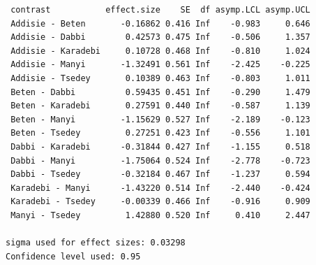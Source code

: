 \documentclass[
  letterpaper,
  DIV=11,
  numbers=noendperiod]{scrartcl}
\begin{document}
\begin{verbatim}
 contrast           effect.size    SE  df asymp.LCL asymp.UCL
 Addisie - Beten       -0.16862 0.416 Inf    -0.983     0.646
 Addisie - Dabbi        0.42573 0.475 Inf    -0.506     1.357
 Addisie - Karadebi     0.10728 0.468 Inf    -0.810     1.024
 Addisie - Manyi       -1.32491 0.561 Inf    -2.425    -0.225
 Addisie - Tsedey       0.10389 0.463 Inf    -0.803     1.011
 Beten - Dabbi          0.59435 0.451 Inf    -0.290     1.479
 Beten - Karadebi       0.27591 0.440 Inf    -0.587     1.139
 Beten - Manyi         -1.15629 0.527 Inf    -2.189    -0.123
 Beten - Tsedey         0.27251 0.423 Inf    -0.556     1.101
 Dabbi - Karadebi      -0.31844 0.427 Inf    -1.155     0.518
 Dabbi - Manyi         -1.75064 0.524 Inf    -2.778    -0.723
 Dabbi - Tsedey        -0.32184 0.467 Inf    -1.237     0.594
 Karadebi - Manyi      -1.43220 0.514 Inf    -2.440    -0.424
 Karadebi - Tsedey     -0.00339 0.466 Inf    -0.916     0.909
 Manyi - Tsedey         1.42880 0.520 Inf     0.410     2.447

sigma used for effect sizes: 0.03298 
Confidence level used: 0.95 
\end{verbatim}
\end{document}
